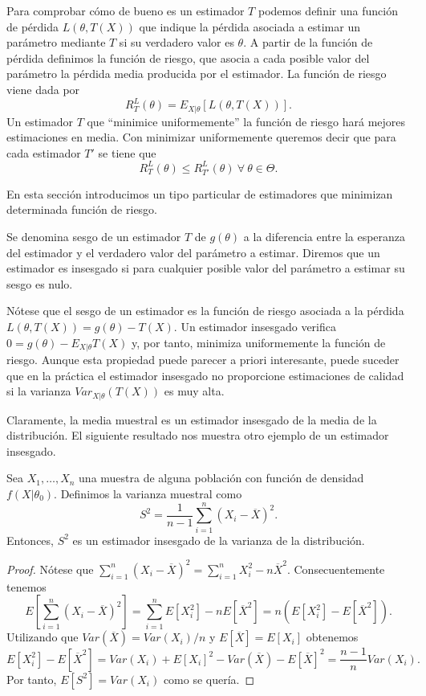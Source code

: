     Para comprobar cómo de bueno es un estimador $T$ podemos definir una función de pérdida $L(\theta,T(X))$ que indique la pérdida asociada a estimar un parámetro mediante $T$ si su verdadero valor es $\theta$. A partir de la función de pérdida definimos la función de riesgo, que asocia a cada posible valor del parámetro la pérdida media producida por el estimador. La función de riesgo viene dada por
    \[ R^L_T(\theta) = E_{X|\theta} [L(\theta,T(X))].\]
    Un estimador $T$ que ``minimice uniformemente'' la función de riesgo hará mejores estimaciones en media. Con minimizar uniformemente queremos decir que para cada estimador $T'$ se tiene que
    \[ R^L_T(\theta) \leq R^L_{T'}(\theta) \ \forall \ \theta \in \Theta.\]

    En esta sección introducimos un tipo particular de estimadores que minimizan determinada función de riesgo.

    \begin{definition}
        Se denomina sesgo de un estimador $T$ de $g(\theta)$ a la diferencia entre la esperanza del estimador y el verdadero valor del parámetro a estimar. Diremos que un estimador es insesgado si para cualquier posible valor del parámetro a estimar su sesgo es nulo.
    \end{definition}

    Nótese que el sesgo de un estimador es la función de riesgo asociada a la pérdida $L(\theta,T(X)) = g(\theta) - T(X)$. Un estimador insesgado verifica $0 = g(\theta) - E_{X|\theta} T(X)$ y, por tanto, minimiza uniformemente la función de riesgo. Aunque esta propiedad puede parecer a priori interesante, puede suceder que en la práctica el estimador insesgado no proporcione estimaciones de calidad si la varianza $Var_{X|\theta}(T(X))$ es muy alta.

    Claramente, la media muestral es un estimador insesgado de la media de la distribución. El siguiente resultado nos muestra otro ejemplo de un estimador insesgado.

    \begin{prop}
        Sea $X_1, \ldots, X_n$ una muestra de alguna población con función de densidad $f(X | \theta_0)$. Definimos la varianza muestral como
        \[S^2 = \frac{1}{n-1}\sum_{i = 1}^n(X_i - \overline{X})^2.\]
        Entonces, $S^2$ es un estimador insesgado de la varianza de la distribución.
    \end{prop}
    \begin{proof}
        Nótese que $\sum_{i = 1}^n(X_i - \overline{X})^2 = \sum_{i = 1}^nX_i^2 - n\overline{X}^2$. Consecuentemente tenemos
        \[E\left[\sum_{i = 1}^n(X_i - \overline{X})^2\right] = \sum_{i = 1}^nE\left[X_i^2\right] -     nE[\overline{X}^2] = n(E\left[X_i^2\right] - E[\overline{X}^2]).\]
        Utilizando que $Var(\overline{X}) = Var(X_i) / n$ y $E[\overline{X}] = E[X_i]$ obtenemos
        \[E[X_i^2] - E[\overline{X}^2] = Var(X_i) + E[X_i]^2 - Var(\overline{X}) - E[\overline{X}]^2 = \frac{n-1}{n} Var(X_i).\]
        Por tanto, $E[S^2] = Var(X_i)$ como se quería.
    \end{proof}

